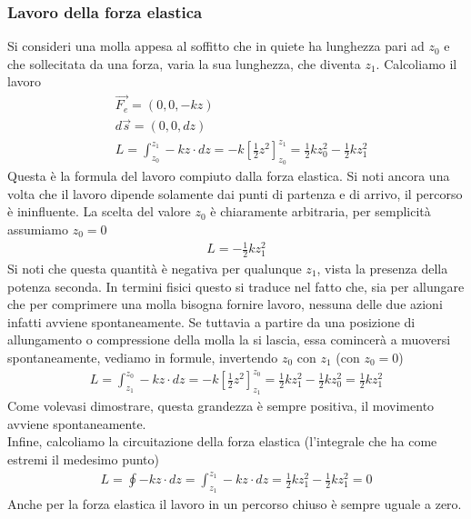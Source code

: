 \subsubsection{Lavoro della forza elastica}
Si consideri una molla appesa al soffitto che in quiete ha lunghezza pari ad $z_0$ e che sollecitata da una forza, varia la sua lunghezza, che diventa $z_1$. Calcoliamo il lavoro
\begin{align*}
	&\vec{F_e}=(0,0,-kz)\\
	&d\vec{s} = (0,0,dz)\\
	&L = \int_{z_0}^{z_1} -kz \cdot dz = -k[\frac{1}{2}z^2]_{z_0}^{z_1} = \frac{1}{2}kz_0^2-\frac{1}{2}kz_1^2
\end{align*} 
Questa è la formula del lavoro compiuto dalla forza elastica. Si noti ancora una volta che il lavoro dipende solamente dai punti di partenza e di arrivo, il percorso è ininfluente. La scelta del valore $z_0$ è chiaramente arbitraria, per semplicità assumiamo $z_0 = 0$
\begin{align*}
	L = -\frac{1}{2}kz_1^2
\end{align*} 
Si noti che questa quantità è negativa per qualunque $z_1$, vista la presenza della potenza seconda. In termini fisici questo si traduce nel fatto che, sia per allungare che per comprimere una molla bisogna fornire lavoro, nessuna delle due azioni infatti avviene spontaneamente. Se tuttavia a partire da una posizione di allungamento o compressione della molla la si lascia, essa comincerà a muoversi spontaneamente, vediamo in formule, invertendo $z_0$ con $z_1$ (con $z_0=0$)
\begin{align*}
		L = \int_{z_1}^{z_0} -kz \cdot dz = -k[\frac{1}{2}z^2]_{z_1}^{z_0} = \frac{1}{2}kz_1^2-\frac{1}{2}kz_0^2=\frac{1}{2}kz_1^2
\end{align*}
Come volevasi dimostrare, questa grandezza è sempre positiva, il movimento avviene spontaneamente.\\
Infine, calcoliamo la circuitazione della forza elastica (l'integrale che ha come estremi il medesimo punto)
\begin{align*}
	L = \oint-kz \cdot dz = \int_{z_1}^{z_1} -kz \cdot dz = \frac{1}{2}kz_1^2-\frac{1}{2}kz_1^2= 0
\end{align*}
Anche per la forza elastica il lavoro in un percorso chiuso è sempre uguale a zero.
